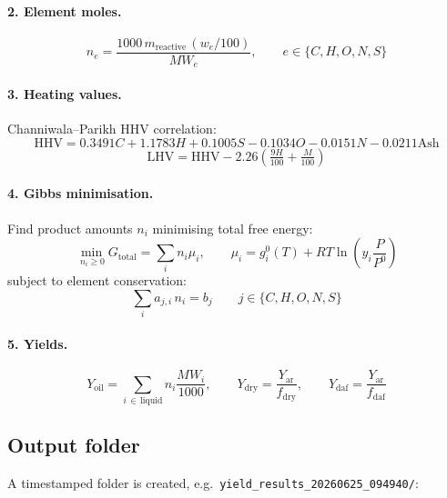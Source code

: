 \documentclass[11pt, a4paper]{article}
\newcommand{\code}[1]{\texttt{#1}}
\begin{document}
\paragraph{2. Element moles.}
\begin{equation}
n_e = \frac{1000\,m_{\text{reactive}}\,(w_e/100)}{MW_e}, \qquad e \in \{C,H,O,N,S\}
\end{equation}

\paragraph{3. Heating values.} Channiwala--Parikh HHV correlation:
\begin{equation}
\text{HHV} = 0.3491C + 1.1783H + 0.1005S - 0.1034O - 0.0151N - 0.0211\text{Ash}
\end{equation}
\begin{equation}
\text{LHV} = \text{HHV} - 2.26\!\left(\tfrac{9H}{100} + \tfrac{M}{100}\right)
\end{equation}

\paragraph{4. Gibbs minimisation.} Find product amounts $n_i$ minimising total free energy:
\begin{equation}
\min_{\,n_i \ge 0} G_{\text{total}} = \sum_i n_i\mu_i, \qquad
\mu_i = g_i^0(T) + RT\ln\!\left(y_i\frac{P}{P^0}\right)
\end{equation}
subject to element conservation:
\begin{equation}
\sum_i a_{j,i}\,n_i = b_j \qquad j \in \{C,H,O,N,S\}
\end{equation}

\paragraph{5. Yields.}
\begin{equation}
Y_{\text{oil}} = \!\!\sum_{i\,\in\,\text{liquid}}\!\! n_i\frac{MW_i}{1000}, \qquad
Y_{\text{dry}} = \frac{Y_{\text{ar}}}{f_{\text{dry}}}, \qquad
Y_{\text{daf}} = \frac{Y_{\text{ar}}}{f_{\text{daf}}}
\end{equation}

\subsection{Output folder}

A timestamped folder is created, e.g.\ \code{yield\_results\_20260625\_094940/}:
\end{document}
